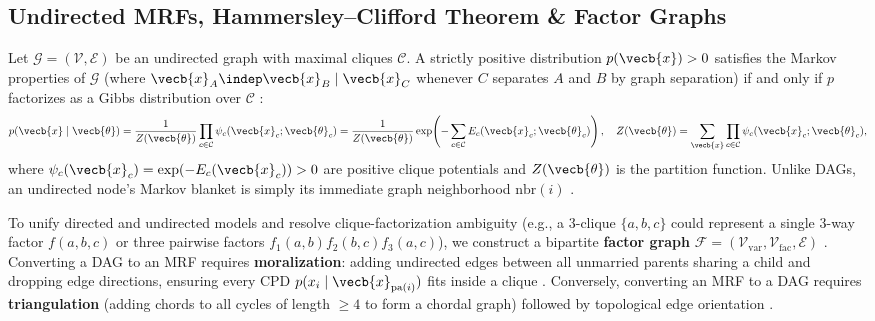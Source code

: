 \documentclass[../../../../master.tex]{subfiles}
\begin{document}
\subsection{Undirected MRFs, Hammersley--Clifford Theorem \& Factor Graphs}

\begin{coremath}
\label{thm:pgmgp:hammersley}
Let $\mathcal{G} = (\mathcal{V}, \mathcal{E})$ be an undirected graph with maximal cliques $\mathcal{C}$. A strictly positive distribution $p(\vecb{x}) > 0$ satisfies the Markov properties of $\mathcal{G}$ (where $\vecb{x}_A \indep \vecb{x}_B \mid \vecb{x}_C$ whenever $C$ separates $A$ and $B$ by graph separation) if and only if $p$ factorizes as a Gibbs distribution over $\mathcal{C}$  :
\begin{equation}
\label{eq:pgmgp:gibbs}
p(\vecb{x} \mid \vecb{\theta}) = \frac{1}{Z(\vecb{\theta})} \prod_{c \in \mathcal{C}} \psi_c(\vecb{x}_c; \vecb{\theta}_c)
= \frac{1}{Z(\vecb{\theta})} \exp\!\left(- \sum_{c \in \mathcal{C}} E_c(\vecb{x}_c; \vecb{\theta}_c)\right),
\quad
Z(\vecb{\theta}) = \sum_{\vecb{x}} \prod_{c \in \mathcal{C}} \psi_c(\vecb{x}_c; \vecb{\theta}_c),
\end{equation}
where $\psi_c(\vecb{x}_c) = \exp(-E_c(\vecb{x}_c)) > 0$ are positive clique potentials and $Z(\vecb{\theta})$ is the partition function. Unlike DAGs, an undirected node's Markov blanket is simply its immediate graph neighborhood $\mathrm{nbr}(i)$ .
\end{coremath}

To unify directed and undirected models and resolve clique-factorization ambiguity (e.g., a $3$-clique $\{a,b,c\}$ could represent a single $3$-way factor $f(a,b,c)$ or three pairwise factors $f_1(a,b)f_2(b,c)f_3(a,c)$), we construct a bipartite \textbf{factor graph} $\mathcal{F} = (\mathcal{V}_{\mathrm{var}}, \mathcal{V}_{\mathrm{fac}}, \mathcal{E})$  . Converting a DAG to an MRF requires \textbf{moralization}: adding undirected edges between all unmarried parents sharing a child and dropping edge directions, ensuring every CPD $p(x_i \mid \vecb{x}_{\mathrm{pa}(i)})$ fits inside a clique . Conversely, converting an MRF to a DAG requires \textbf{triangulation} (adding chords to all cycles of length $\ge 4$ to form a chordal graph) followed by topological edge orientation .
\end{document}

